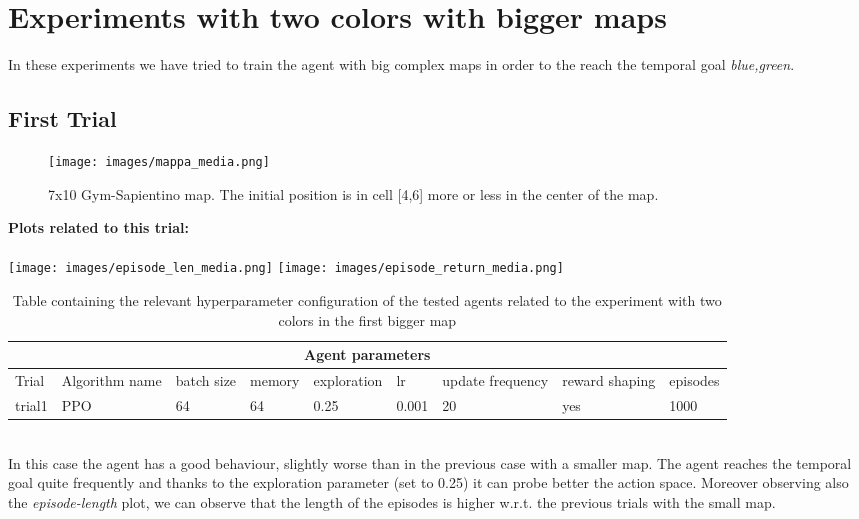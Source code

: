 \documentclass{article}
\begin{document}
\noindent

\section{Experiments with two colors with  bigger maps}
In these experiments we have tried to train the agent with  big complex maps in order to the reach the temporal goal \textit{blue,green}.

\subsection{First Trial}

\begin{figure}[h]
    \centering
    \texttt{[image: images/mappa\_media.png]}
    \caption{7x10 Gym-Sapientino map. The initial position is in cell [4,6] more or less in the center of the map.}
    \label{fig:twoColorIntermediateSizeMap}
\end{figure}


\noindent
\textbf{Plots related to this trial:}\\\\

\texttt{[image: images/episode\_len\_media.png]}
\texttt{[image: images/episode\_return\_media.png]}


\begin{table}[ht]
\begin{tabular}{|p{1cm} |p{2cm}||p{1cm}|p{1.5cm}|p{2cm}|p{1cm}|p{1cm}|p{1cm}|p{1.1cm}|  }
 \hline
 \multicolumn{9}{|c|}{Agent parameters} \\
 \hline
Trial & Algorithm name & batch size & memory & exploration & lr & update frequency &reward shaping & episodes \\

\hline
trial1& PPO & 64 & 64 & 0.25 & 0.001 & 20&  yes &1000 \\
\hline
\end{tabular}
\caption{Table containing the relevant hyperparameter configuration of the tested agents related to the  experiment with two colors in the first bigger map}
\end{table}

\noindent\\
In this case the agent has a good behaviour, slightly worse than in the previous case with a smaller map. The agent reaches the temporal goal quite frequently and thanks to the exploration parameter (set to 0.25) it can probe better the action space. Moreover observing also the \textit{episode-length} plot, we can observe that the length of the episodes is higher w.r.t. the previous trials with the small map.
\end{document}
